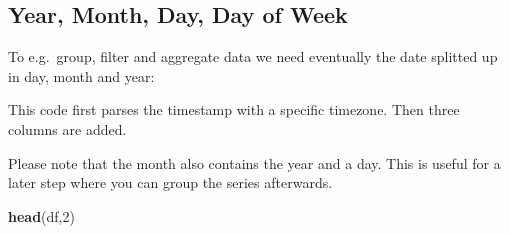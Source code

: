 \documentclass[
]{book}
\newenvironment{Shaded}{\begin{snugshade}}{\end{snugshade}}
\newcommand{\DataTypeTok}[1]{\textcolor[rgb]{0.13,0.29,0.53}{#1}}
\newcommand{\DecValTok}[1]{\textcolor[rgb]{0.00,0.00,0.81}{#1}}
\newcommand{\KeywordTok}[1]{\textcolor[rgb]{0.13,0.29,0.53}{\textbf{#1}}}
\newcommand{\NormalTok}[1]{#1}
\newcommand{\OperatorTok}[1]{\textcolor[rgb]{0.81,0.36,0.00}{\textbf{#1}}}
\newcommand{\OtherTok}[1]{\textcolor[rgb]{0.56,0.35,0.01}{#1}}
\newcommand{\StringTok}[1]{\textcolor[rgb]{0.31,0.60,0.02}{#1}}
\let\oldShaded\Shaded
\let\endoldShaded\endShaded
\renewenvironment{Shaded}{\footnotesize\oldShaded}{\endoldShaded}
\begin{document}
\hypertarget{year-month-day-day-of-week}{%
\subsection{Year, Month, Day, Day of Week}\label{year-month-day-day-of-week}}

To e.g.~group, filter and aggregate data we need eventually the date splitted up in day, month and year:

\begin{Shaded}
\end{Shaded}

This code first parses the timestamp with a specific timezone. Then three columns are added.

Please note that the month also contains the year and a day. This is useful for a later step where you can group the series afterwards.

\begin{Shaded}
\begin{Highlighting}[]
\KeywordTok{head}\NormalTok{(df,}\DecValTok{2}\NormalTok{)}
\end{Highlighting}
\end{Shaded}
\end{document}
